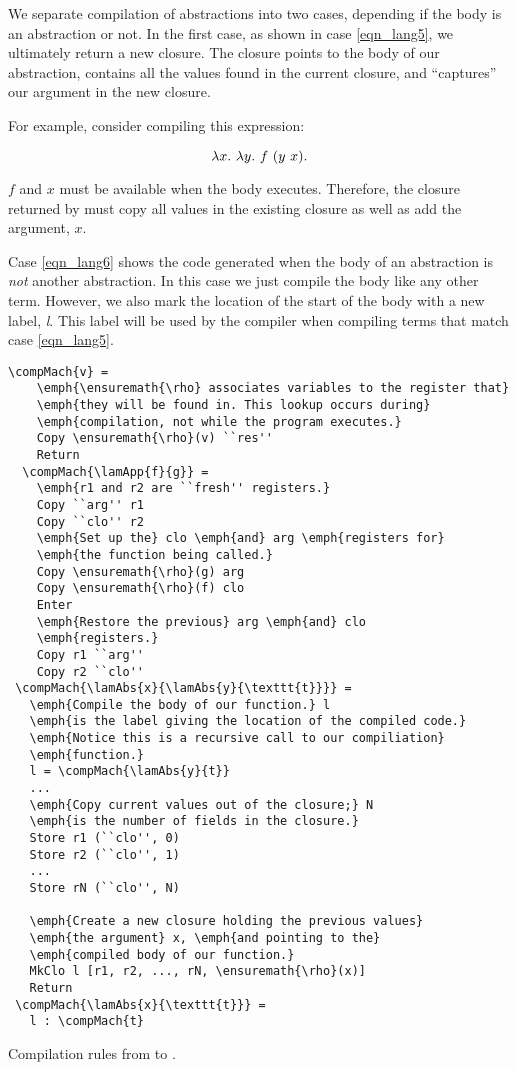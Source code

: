 \documentclass[12pt]{report}
\begin{document}
We separate compilation of abstractions into two cases, depending if
the body is an abstraction or not. In the first case, as shown in case
\ref{eqn_lang5}, we ultimately return a new closure. The closure
points to the body of our abstraction, contains all the values found
in the current closure, and ``captures'' our argument in the new
closure. 

For example, consider compiling this expression:

\begin{equation}
  \lambda x.\ \lambda y.\ f\ (y\ x). 
\end{equation}

$f$ and $x$ must be available when the body
 executes. Therefore, the closure returned
by  must copy all values in the existing
closure as well as add the argument, $x$.

Case \ref{eqn_lang6} shows the code generated when the body of
an abstraction is \emph{not} another abstraction. In this case
we just compile the body like any other term. However, we also
mark the location of the start of the body with a  new label, \emph{l}. This
label will be used by the compiler when compiling terms that match
case \ref{eqn_lang5}.

\begin{myfig}[th]
\begin{minipage}{4in}
\begin{Verbatim}[commandchars=\\\{\}]
  \compMach{v} = 
    \emph{\ensuremath{\rho} associates variables to the register that}
    \emph{they will be found in. This lookup occurs during}
    \emph{compilation, not while the program executes.}
    Copy \ensuremath{\rho}(v) ``res''
    Return
  \compMach{\lamApp{f}{g}} = 
    \emph{r1 and r2 are ``fresh'' registers.} 
    Copy ``arg'' r1
    Copy ``clo'' r2
    \emph{Set up the} clo \emph{and} arg \emph{registers for}
    \emph{the function being called.}
    Copy \ensuremath{\rho}(g) arg
    Copy \ensuremath{\rho}(f) clo
    Enter
    \emph{Restore the previous} arg \emph{and} clo 
    \emph{registers.}
    Copy r1 ``arg''
    Copy r2 ``clo''
 \compMach{\lamAbs{x}{\lamAbs{y}{\texttt{t}}}} = 
   \emph{Compile the body of our function.} l 
   \emph{is the label giving the location of the compiled code.}
   \emph{Notice this is a recursive call to our compiliation}
   \emph{function.}
   l = \compMach{\lamAbs{y}{t}}
   ...
   \emph{Copy current values out of the closure;} N
   \emph{is the number of fields in the closure.}
   Store r1 (``clo'', 0) 
   Store r2 (``clo'', 1) 
   ...
   Store rN (``clo'', N)
   
   \emph{Create a new closure holding the previous values}
   \emph{the argument} x, \emph{and pointing to the}
   \emph{compiled body of our function.}
   MkClo l [r1, r2, ..., rN, \ensuremath{\rho}(x)]
   Return
 \compMach{\lamAbs{x}{\texttt{t}}} = 
   l : \compMach{t}
\end{Verbatim}
\end{minipage}
\caption{Compilation rules from \lamA to \machLam.}
\label{tbl_lang2}
\end{myfig}
\end{document}
